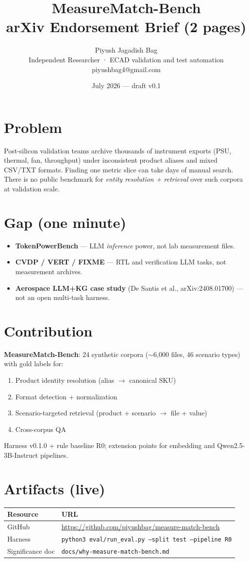 \documentclass[10pt]{article}
\title{\textbf{MeasureMatch-Bench}\\\large arXiv Endorsement Brief (2 pages)}
\author{Piyush Jagadish Bag\\Independent Researcher · ECAD validation and test automation\\piyushbag4@gmail.com}
\date{July 2026 — draft v0.1}
\begin{document}
\maketitle

\section*{Problem}
Post-silicon validation teams archive thousands of instrument exports (PSU, thermal, fan, throughput) under inconsistent product aliases and mixed CSV/TXT formats.
Finding one metric slice can take days of manual search.
There is no public benchmark for \emph{entity resolution + retrieval} over such corpora at validation scale.

\section*{Gap (one minute)}
\begin{itemize}
  \item \textbf{TokenPowerBench} --- LLM \emph{inference} power, not lab measurement files.
  \item \textbf{CVDP / VERT / FIXME} --- RTL and verification LLM tasks, not measurement archives.
  \item \textbf{Aerospace LLM+KG case study} (De Santis et al., arXiv:2408.01700) --- not an open multi-task harness.
\end{itemize}

\section*{Contribution}
\textbf{MeasureMatch-Bench}: 24 synthetic corpora ($\sim$6{,}000 files, 46 scenario types) with gold labels for:
\begin{enumerate}
  \item[T1] Product identity resolution (alias $\rightarrow$ canonical SKU)
  \item[T2] Format detection + normalization
  \item[T3] Scenario-targeted retrieval (product + scenario $\rightarrow$ file + value)
  \item[T4] Cross-corpus QA
\end{enumerate}
Harness v0.1.0 + rule baseline R0; extension points for embedding and Qwen2.5-3B-Instruct pipelines.

\section*{Artifacts (live)}
\begin{tabular}{@{}ll@{}}
\toprule
Resource & URL \\
\midrule
GitHub & \url{https://github.com/piyushbag/measure-match-bench} \\
Harness & \texttt{python3 eval/run\_eval.py --split test --pipeline R0} \\
Significance doc & \texttt{docs/why-measure-match-bench.md} \\
\bottomrule
\end{tabular}
\end{document}
